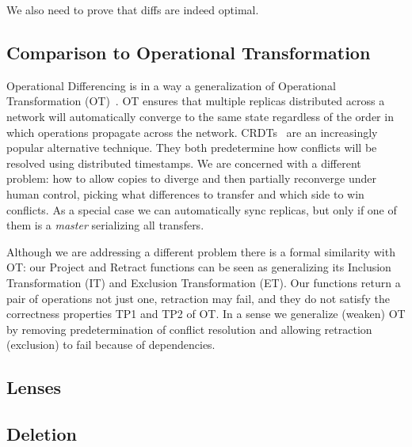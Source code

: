 \documentclass[english,submission]{programming}
\theoremstyle{definition}
\begin{document}
We also need to prove that diffs are indeed optimal.


\subsection{Comparison to Operational Transformation}

Operational Differencing is in a way a generalization of Operational Transformation (OT)~\cite{Ellis89, Ressel96, Oster06}.
OT ensures that multiple replicas distributed across a network will automatically converge to the same state regardless of the order in which operations propagate across the network. CRDTs~\cite{Shapiro11} are an increasingly popular alternative technique. They both predetermine how conflicts will be resolved using distributed timestamps. We are concerned with a different problem: how to allow copies to diverge and then partially reconverge under human control, picking what differences to transfer and which side to win conflicts. As a special case we can automatically sync replicas, but only if one of them is a \textit{master} serializing all transfers.

Although we are addressing a different problem there is a formal similarity with OT: our Project and Retract functions can be seen as generalizing its Inclusion Transformation (IT) and Exclusion Transformation (ET). Our functions return a pair of operations not just one, retraction may fail, and they do not satisfy the correctness properties TP1 and TP2 of OT. In a sense we generalize (weaken) OT by removing predetermination of conflict resolution and allowing retraction (exclusion) to fail because of dependencies.


\subsection{Lenses}

\subsection{Deletion}

\end{document}

